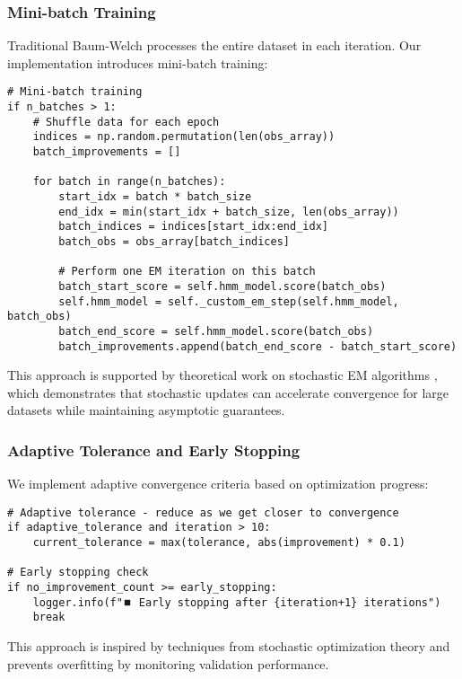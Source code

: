 \documentclass[12pt,a4paper]{article}
\begin{document}
\subsubsection{Mini-batch Training}

Traditional Baum-Welch processes the entire dataset in each iteration. Our implementation introduces mini-batch training:

\begin{verbatim}
# Mini-batch training
if n_batches > 1:
    # Shuffle data for each epoch
    indices = np.random.permutation(len(obs_array))
    batch_improvements = []
    
    for batch in range(n_batches):
        start_idx = batch * batch_size
        end_idx = min(start_idx + batch_size, len(obs_array))
        batch_indices = indices[start_idx:end_idx]
        batch_obs = obs_array[batch_indices]
        
        # Perform one EM iteration on this batch
        batch_start_score = self.hmm_model.score(batch_obs)
        self.hmm_model = self._custom_em_step(self.hmm_model, batch_obs)
        batch_end_score = self.hmm_model.score(batch_obs)
        batch_improvements.append(batch_end_score - batch_start_score)
\end{verbatim}

This approach is supported by theoretical work on stochastic EM algorithms \cite{neal1998view}, which demonstrates that stochastic updates can accelerate convergence for large datasets while maintaining asymptotic guarantees.

\subsubsection{Adaptive Tolerance and Early Stopping}

We implement adaptive convergence criteria based on optimization progress:

\begin{verbatim}
# Adaptive tolerance - reduce as we get closer to convergence
if adaptive_tolerance and iteration > 10:
    current_tolerance = max(tolerance, abs(improvement) * 0.1)

# Early stopping check
if no_improvement_count >= early_stopping:
    logger.info(f"⏹️ Early stopping after {iteration+1} iterations")
    break
\end{verbatim}

This approach is inspired by techniques from stochastic optimization theory \cite{bottou2018optimization} and prevents overfitting by monitoring validation performance.
\end{document}
